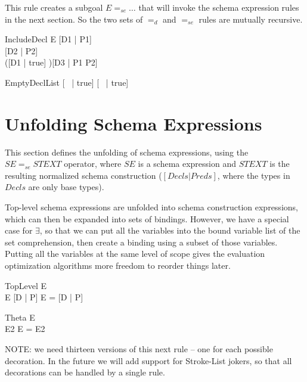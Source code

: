 \documentclass{article}
\newcommand{\sexprUnfoldsTo}{\mathrel{=_{se}}}
\newcommand{\declListUnfoldsTo}{\mathrel{=_d}}
\begin{document}
This rule creates a subgoal $E \sexprUnfoldsTo \ldots$ that will
invoke the schema expression rules in the next section.  So the
two sets of $\declListUnfoldsTo$ and $\sexprUnfoldsTo$ rules are
mutually recursive.

\begin{zedrule}{IncludeDecl}
   E \sexprUnfoldsTo [D1 | P1] \\
   [D | true] \declListUnfoldsTo [D2 | P2] \\
   ([D1 | true] \land [D2 | true])\hasType \power [D3 | true] 
\derives
   [E; D | true] \declListUnfoldsTo [D3 |  P1 \land P2]
\end{zedrule}

\begin{zedrule}{EmptyDeclList}
   [~ | true] \declListUnfoldsTo [~ | true]
\end{zedrule}


\section{Unfolding Schema Expressions}

This section defines the unfolding of schema expressions,
using the $SE \sexprUnfoldsTo STEXT$ operator, where $SE$
is a schema expression and $STEXT$ is the resulting normalized
schema construction ($[Decls|Preds]$, where the types in $Decls$
are only base types).

Top-level schema expressions are unfolded into schema construction
expressions, which can then be expanded into sets of bindings.
However, we have a special case for $\exists$, so that we can
put all the variables into the bound variable list of the
set comprehension, then create a binding using a subset of
those variables.  Putting all the variables at the same level
of scope gives the evaluation optimization algorithms more
freedom to reorder things later.

\begin{zedrule}{TopLevel}
  E \hasType \power [D2 | true] \\
  E  \sexprUnfoldsTo [D | P]
\derives
  E = [D | P]
\end{zedrule}

\begin{zedrule}{Theta}
  E \hasType \power [D | true] \\
  \theta [D | true] \is E2
\derives
  \theta E = E2
\end{zedrule}

NOTE: we need thirteen versions of this next rule -- one for
each possible decoration.   In the future we will add
support for Stroke-List jokers, so that all decorations can
be handled by a single rule.
\end{document}
